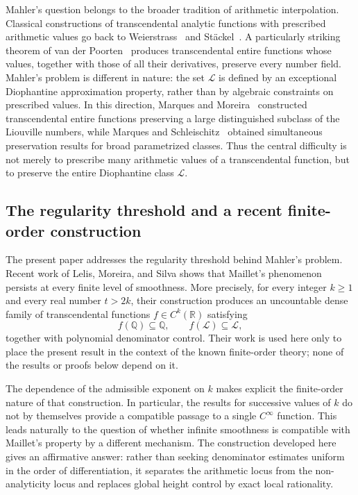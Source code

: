 \documentclass[11pt,reqno]{amsart}
\numberwithin{equation}{section}
\theoremstyle{definition}
\theoremstyle{remark}
\newcommand{\R}{\mathbb R}
\newcommand{\Q}{\mathbb Q}
\newcommand{\Lio}{\mathscr L}
\begin{document}
Mahler's question belongs to the broader tradition of arithmetic
interpolation. Classical constructions of transcendental analytic functions
with prescribed arithmetic values go back to
Weierstrass~\cite{Weierstrass1923} and
St\"ackel~\cite{Stackel1895,Stackel1902}. A particularly striking theorem of
van der Poorten~\cite{vanderPoorten1968} produces transcendental entire
functions whose values, together with those of all their derivatives,
preserve every number field. Mahler's problem is different in nature: the
set $\Lio$ is defined by an exceptional Diophantine approximation property,
rather than by algebraic constraints on prescribed values. In this direction,
Marques and Moreira~\cite{MarquesMoreira2015} constructed transcendental
entire functions preserving a large distinguished subclass of the Liouville
numbers, while Marques and Schleischitz~\cite{MarquesSchleischitz2016}
obtained simultaneous preservation results for broad parametrized classes.
Thus the central difficulty is not merely to prescribe many arithmetic
values of a transcendental function, but to preserve the entire Diophantine
class $\Lio$.

\subsection*{The regularity threshold and a recent finite-order construction}

The present paper addresses the regularity threshold behind Mahler's
problem. Recent work of Lelis, Moreira, and Silva
\cite[Theorem~1.2 and Corollary~1.3]{LMS2026} shows that Maillet's
phenomenon persists at every finite level of smoothness. More precisely,
for every integer $k\geq1$ and every real number $t>2k$, their construction
produces an uncountable dense family of transcendental functions
$f\in C^k(\R)$ satisfying
\[
f(\Q)\subseteq\Q,
\qquad
f(\Lio)\subseteq\Lio,
\]
together with polynomial denominator control. Their work is
used here only to place the present result in the context of the known
finite-order theory; none of the results or proofs below depend on it.

The dependence of the admissible exponent on $k$ makes explicit the
finite-order nature of that construction. In particular, the results for
successive values of $k$ do not by themselves provide a compatible passage
to a single $C^\infty$ function. This leads naturally to the question of
whether infinite smoothness is compatible with Maillet's property by a
different mechanism. The construction developed here gives an affirmative
answer: rather than seeking denominator estimates uniform in the order of
differentiation, it separates the arithmetic locus from the
non-analyticity locus and replaces global height control by exact local
rationality.
\end{document}
